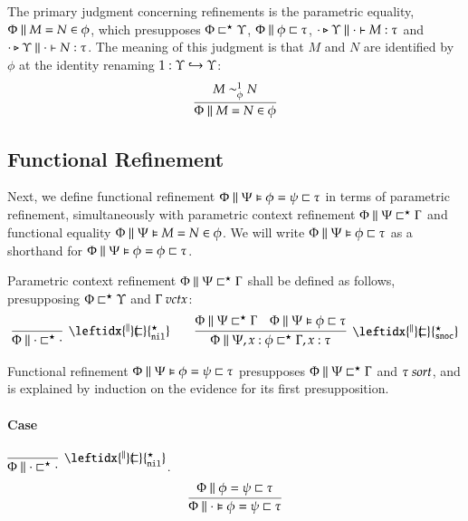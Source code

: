 \documentclass[11pt]{article}
\theoremstyle{definition}
\theoremstyle{remark}
\numberwithin{equation}{section}
\def\IModeColorName{MidnightBlue}
\def\OModeColorName{Maroon}
\def\IModeColorName{Black}
\def\OModeColorName{Black}
\newcommand\IMode[1]{{\color{\IModeColorName}{#1}}}
\newcommand\OMode[1]{{\color{\OModeColorName}{#1}}}
\newcommand\Of[2]{\IMode{#1}: \IMode{#2}}
\newcommand\IsSort[1]{\IMode{#1}\ \textit{sort}}
\newcommand\IsVarCtx[1]{\IMode{#1}\ \textit{vctx}}
\newcommand\IsAbtUnmoded[5]{
  #1\triangleright%
  #2\parallel%
  #3\vdash%
  #4:\OMode{#5}%
}
\newcommand\IsAbt[5]{\IsAbtUnmoded{\IMode{#1}}{\IMode{#2}}{\IMode{#3}}{\IMode{#4}}{\OMode{#5}}}
\newcommand\Refines[3]{\IMode{#1}\parallel\IMode{#2}\sqsubset\OMode{#3}}
\newcommand\RefinesCtx[2]{\IMode{#1}\sqsubset^\star\OMode{#2}}
\newcommand\EqRefines[4]{\IMode{#1}\parallel\IMode{#2}=\IMode{#3}\sqsubset\OMode{#4}}
\newcommand\HRefines[4]{\IMode{#1}\parallel\IMode{#2}\vDash\IMode{#3}\sqsubset\OMode{#4}}
\newcommand\HEqRefines[5]{\IMode{#1}\parallel\IMode{#2}\vDash\IMode{#3}=\IMode{#4}\sqsubset\OMode{#5}}
\newcommand\PRefinesCtx[3]{\IMode{#1}\parallel\IMode{#2}\sqsubset^\star\OMode{#3}}
\newcommand\RMemEq[4]{\IMode{#1}\parallel\IMode{#2}=\IMode{#3}\in\IMode{#4}}
\newcommand\HRMemEq[5]{\IMode{#1}\parallel\IMode{#2}\vDash\IMode{#3}=\IMode{#4}\in\IMode{#5}}
\begin{document}
The primary judgment concerning refinements is the parametric equality,
$\RMemEq{\Phi}{M}{N}{\phi}$, which presupposes $\RefinesCtx{\Phi}{\Upsilon}$,
$\Refines{\Phi}{\phi}{\tau}$, $\IsAbt{\cdot}{\Upsilon}{\cdot}{M}{\tau}$ and
$\IsAbt{\cdot}{\Upsilon}{\cdot}{N}{\tau}$. The meaning of this judgment is that
$M$ and $N$ are identified by $\phi$ at the identity renaming
$\Of{1}{\IMode{\Upsilon}\hookrightarrow\OMode{\Upsilon}}$:
\[
  \infer{
    \RMemEq{\Phi}{M}{N}{\phi}
  }{
    \IMode{M}\sim^1_\phi\IMode{N}
  }
\]

\subsection{Functional Refinement}

\newcommand\PRefinesCtxNil{\leftidx{^\parallel}{\!\!\sqsubset}{^\star_{\mathtt{nil}}}}
\newcommand\PRefinesCtxSnoc{\leftidx{^\parallel}{\!\!\sqsubset}{^\star_{\mathtt{snoc}}}}

Next, we define functional refinement
$\HEqRefines{\Phi}{\Psi}{\phi}{\psi}{\tau}$ in terms of parametric refinement,
simultaneously with parametric context refinement
$\PRefinesCtx{\Phi}{\Psi}{\Gamma}$ and functional equality
$\HRMemEq{\Phi}{\Psi}{M}{N}{\phi}$. We will write
$\HRefines{\Phi}{\Psi}{\phi}{\tau}$ as a shorthand for
$\HEqRefines{\Phi}{\Psi}{\phi}{\phi}{\tau}$.

\newcommand\DefPRefinesCtxNil[1]{
  \infer[\PRefinesCtxNil]{
    \PRefinesCtx{#1}{\cdot}{\cdot}
  }{
  }
}
\newcommand\DefPRefinesCtxSnoc[6]{
  \infer[\PRefinesCtxSnoc]{
    \PRefinesCtx{#1}{#2,#3:#4}{#5,#3:#6}
  }{
    \PRefinesCtx{#1}{#2}{#5} &
    \HRefines{#1}{#2}{#4}{#6}
  }
}

Parametric context refinement $\PRefinesCtx{\Phi}{\Psi}{\Gamma}$ shall be
defined as follows, presupposing $\RefinesCtx{\Phi}{\Upsilon}$ and
$\IsVarCtx{\Gamma}$:
\begin{gather*}
  \DefPRefinesCtxNil{\Phi}\qquad
  \DefPRefinesCtxSnoc{\Phi}{\Psi}{x}{\phi}{\Gamma}{\tau}
\end{gather*}

Functional refinement $\HEqRefines{\Phi}{\Psi}{\phi}{\psi}{\tau}$ presupposes
$\PRefinesCtx{\Phi}{\Psi}{\Gamma}$ and $\IsSort{\tau}$, and is explained by
induction on the evidence for its first presupposition.

\paragraph{Case} $\DefPRefinesCtxNil{\Phi}$.
\[
  \infer{
    \HEqRefines{\Phi}{\cdot}{\phi}{\psi}{\tau}
  }{
    \EqRefines{\Phi}{\phi}{\psi}{\tau}
  }
\]
\end{document}
